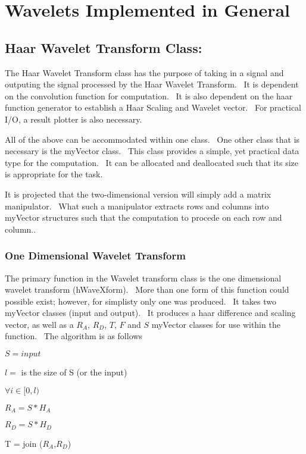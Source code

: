 \chapter{Wavelets Implemented in General}
\section{Haar Wavelet Transform Class:}

\bigskip The Haar Wavelet Transform class has the purpose of taking in a
signal and outputing the signal processed by the Haar Wavelet Transform. \
It is dependent on the convolution function for computation. \ It is also
dependent on the haar function generator to establish a Haar Scaling and
Wavelet vector. \ For practical I/O, a result plotter is also necessary. \ 

\bigskip All of the above can be accommodated within one class. \ One other
class that is necessary is the myVector class. \ This class provides a
simple, yet practical data type for the computation. \ It can be allocated
and deallocated such that its size is appropriate for the task. \ 

It is projected that the two-dimensional version will simply add a matrix
manipulator. \ What such a manipulator extracts rows and columns into
myVector structures such that the computation to procede on each row and
column.. \ 

\subsection{\protect\bigskip One Dimensional Wavelet Transform}

The primary function in the Wavelet transform class is the one dimensional
wavelet transform (hWaveXform). \ More than one form of this function could
possible exist; however, for simplisty only one was produced. \ It takes two
myVector classes (input and output). \ It produces a haar difference and
scaling vector, as well as a $R_{A}$, $R_{D}$, $T$, $F$ and $S$ myVector
classes for use within the function. \ The algorithm is as follows

$S=input$

$l=$ is the size of S (or the input)

$\forall i\in \lbrack 0,l)$

\qquad $R_{A}=S\ast H_{A}$

\qquad $R_{D}=S\ast H_{D}$

\qquad T = join ($R_{A}$,$R_{D}$)

